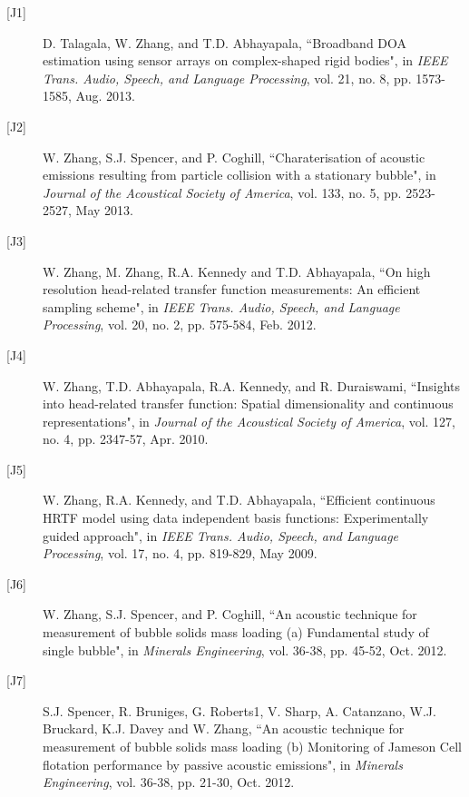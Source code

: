 \documentclass[11pt]{article}
\begin{document}
\begin{description}

\item[{[}J1{]}] D. Talagala, W. Zhang, and T.D. Abhayapala, ``Broadband DOA estimation using sensor arrays on complex-shaped rigid bodies", in {\em IEEE Trans. Audio, Speech, and Language Processing}, vol. 21, no. 8, pp. 1573-1585, Aug. 2013.
    
\item[{[}J2{]}] W. Zhang, S.J. Spencer, and P. Coghill,
``Charaterisation of acoustic emissions resulting from particle collision with a stationary bubble", in {\em Journal of the Acoustical Society of America}, vol. 133, no. 5, pp. 2523-2527, May 2013.


\item[{[}J3{]}] W. Zhang, M. Zhang, R.A. Kennedy and T.D. Abhayapala, ``On high resolution head-related transfer function measurements: An efficient sampling scheme", in \emph{IEEE Trans. Audio, Speech, and Language Processing}, vol. 20, no. 2, pp. 575-584, Feb. 2012.

\item[{[}J4{]}] W. Zhang, T.D. Abhayapala, R.A. Kennedy, and R. Duraiswami,
``Insights into head-related transfer function: Spatial dimensionality and continuous representations",
in \emph{Journal of the Acoustical Society of America}, vol. 127, no. 4, pp. 2347-57, Apr. 2010.

\item[{[}J5{]}] W. Zhang, R.A. Kennedy, and T.D. Abhayapala,
``Efficient continuous HRTF model using data independent basis functions: Experimentally guided approach", in {\em
IEEE Trans. Audio, Speech, and Language Processing}, vol. 17, no. 4, pp. 819-829, May 2009.

\item[{[}J6{]}] W. Zhang, S.J. Spencer, and P. Coghill,
``An acoustic technique for measurement of bubble solids mass loading (a) Fundamental study of single bubble", in {\em Minerals Engineering}, vol. 36-38, pp. 45-52, Oct. 2012.

\item[{[}J7{]}] S.J. Spencer, R. Bruniges, G. Roberts1, V. Sharp, A. Catanzano, W.J. Bruckard, K.J. Davey and W. Zhang,
``An acoustic technique for measurement of bubble solids mass loading (b) Monitoring of Jameson Cell flotation performance by passive acoustic emissions", in {\em Minerals Engineering}, vol. 36-38, pp. 21-30, Oct. 2012.

%


\end{description}
\end{document}

